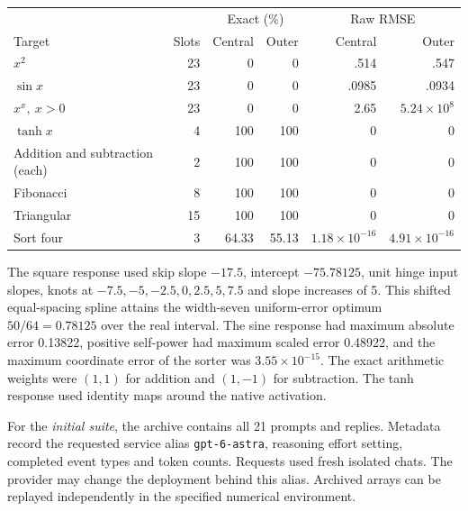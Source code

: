 \begin{center}
\begin{minipage}{\linewidth}
\centering
\makeatletter{}\makeatother
\caption{First WSP response on each of nine tasks. Exact percentages and raw RMSE use the same central and outer observations. Addition and subtraction have separate, identical scores.}\label{tab:pilot}
\small\setlength{\tabcolsep}{3.5pt}
\begin{tabular}{@{}lrrrrr@{}}\toprule
& & \multicolumn{2}{c}{Exact (\%)} & \multicolumn{2}{c}{Raw RMSE}\\
Target & Slots & Central & Outer & Central & Outer\\\midrule
\(x^2\) & 23 & 0 & 0 & .514 & .547\\
\(\sin x\) & 23 & 0 & 0 & .0985 & .0934\\
\(x^x,\ x>0\) & 23 & 0 & 0 & 2.65 & \(5.24\times 10^8\)\\
\(\tanh x\) & 4 & 100 & 100 & 0 & 0\\
Addition and subtraction (each) & 2 & 100 & 100 & 0 & 0\\
Fibonacci & 8 & 100 & 100 & 0 & 0\\
Triangular & 15 & 100 & 100 & 0 & 0\\
Sort four & 3 & 64.33 & 55.13 & \(1.18\times10^{-16}\) & \(4.91\times10^{-16}\)\\\bottomrule
\end{tabular}
\end{minipage}
\end{center}
The square response used skip slope \(-17.5\), intercept \(-75.78125\), unit hinge input slopes, knots at \(-7.5,-5,-2.5,0,2.5,5,7.5\) and slope increases of 5. This shifted equal-spacing spline attains the width-seven uniform-error optimum \(50/64=0.78125\) over the real interval. The sine response had maximum absolute error 0.13822, positive self-power had maximum scaled error 0.48922, and the maximum coordinate error of the sorter was \(3.55\times10^{-15}\). The exact arithmetic weights were \((1,1)\) for addition and \((1,-1)\) for subtraction. The tanh response used identity maps around the native activation.

For the \emph{initial suite}, the archive contains all 21 prompts and replies. Metadata record the requested service alias \texttt{gpt-6-astra}, reasoning effort setting, completed event types and token counts. Requests used fresh isolated chats. The provider may change the deployment behind this alias. Archived arrays can be replayed independently in the specified numerical environment.

